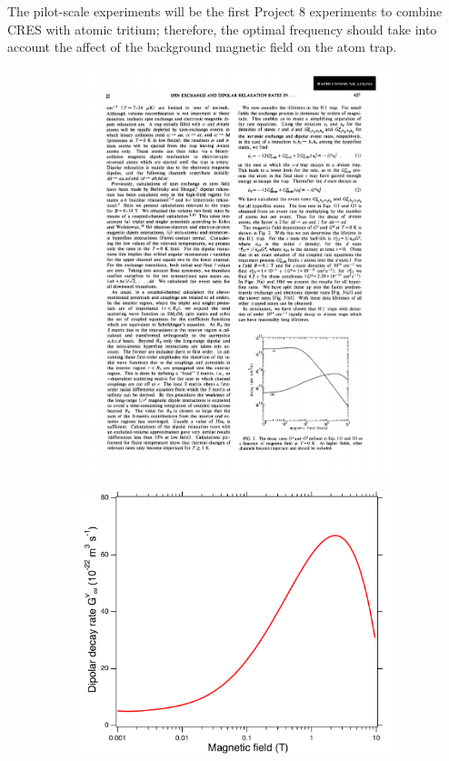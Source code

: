 The pilot-scale experiments will be the first Project 8 experiments to combine CRES with atomic tritium; therefore, the optimal frequency should take into account the affect of the background magnetic field on the atom trap.
\begin{figure}[htbp]
    \centering
    \begin{subfigure}{0.46\textwidth}
        \includegraphics*[width=\textwidth]{figs/Chapter-3/gloss.pdf}
        \caption{}
    \end{subfigure}
    \hfill
    \begin{subfigure}{0.49\textwidth}
        \includegraphics*[width=\textwidth]{figs/Chapter-3/dipolarloss.pdf}

\end{subfigure}
\end{figure}
